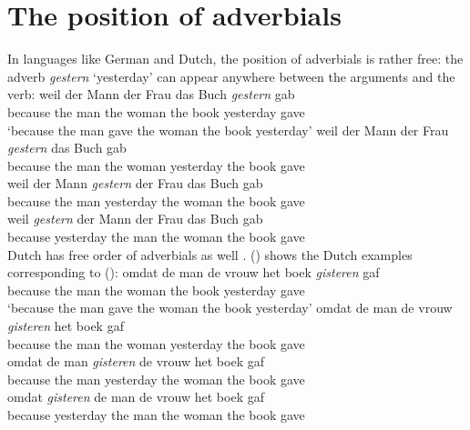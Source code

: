 \section{The position of adverbials}


In languages like German and Dutch, the position of adverbials is rather free: the adverb \emph{gestern}
`yesterday' can appear anywhere between the arguments and the verb:
\eal
\ex
\gll weil der Mann der Frau das Buch \emph{gestern} gab\\ 
     because the man the woman the book yesterday gave\\\german
\glt `because the man gave the woman the book yesterday'
\ex 
\gll weil der Mann der Frau \emph{gestern} das Buch gab\\
     because the man the woman yesterday the book gave\\
\ex 
\gll weil der Mann \emph{gestern} der Frau das Buch gab\\
     because the man yesterday the woman the book gave\\
\ex 
\gll weil \emph{gestern} der Mann der Frau das Buch gab\\
     because yesterday the man the woman the book gave\\
\zl
Dutch has free order of adverbials as well \parencites[]{Koster99a-u}[Section~6]{Bouma2003a-u}. () shows the Dutch examples corresponding to ():
\eal
\ex
\gll omdat de man de vrouw het boek \emph{gisteren} gaf\\ 
     because the man the woman the book yesterday gave\\\dutch
\glt `because the man gave the woman the book yesterday'
\ex 
\gll omdat de man de vrouw \emph{gisteren} het boek gaf\\
     because the man the woman yesterday the book gave\\
\ex 
\gll omdat de man \emph{gisteren} de vrouw het boek gaf\\
     because the man yesterday the woman the book gave\\
\ex 
\gll omdat \emph{gisteren} de man de vrouw het boek gaf\\
     because yesterday the man the woman the book gave\\
\zl



